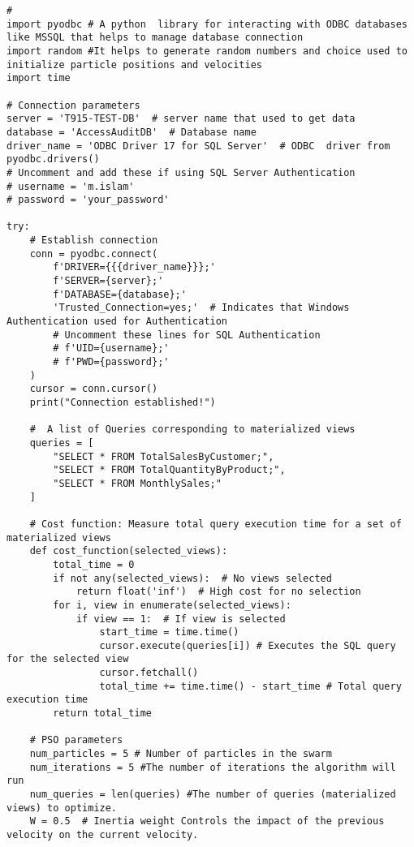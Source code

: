 \begin{lstlisting}[style=pythonstyle, caption={Python script to automate optimal view.}, label={lst:pso_query_optimization}]



# 
import pyodbc # A python  library for interacting with ODBC databases like MSSQL that helps to manage database connection
import random #It helps to generate random numbers and choice used to initialize particle positions and velocities
import time

# Connection parameters
server = 'T915-TEST-DB'  # server name that used to get data 
database = 'AccessAuditDB'  # Database name
driver_name = 'ODBC Driver 17 for SQL Server'  # ODBC  driver from pyodbc.drivers()
# Uncomment and add these if using SQL Server Authentication
# username = 'm.islam'
# password = 'your_password'

try:
    # Establish connection
    conn = pyodbc.connect(
        f'DRIVER={{{driver_name}}};'
        f'SERVER={server};'
        f'DATABASE={database};'
        'Trusted_Connection=yes;'  # Indicates that Windows Authentication used for Authentication
        # Uncomment these lines for SQL Authentication
        # f'UID={username};'
        # f'PWD={password};'
    )
    cursor = conn.cursor()
    print("Connection established!")

    #  A list of Queries corresponding to materialized views
    queries = [
        "SELECT * FROM TotalSalesByCustomer;",
        "SELECT * FROM TotalQuantityByProduct;",
        "SELECT * FROM MonthlySales;"
    ]

    # Cost function: Measure total query execution time for a set of materialized views 
    def cost_function(selected_views):
        total_time = 0
        if not any(selected_views):  # No views selected
            return float('inf')  # High cost for no selection
        for i, view in enumerate(selected_views):
            if view == 1:  # If view is selected
                start_time = time.time()
                cursor.execute(queries[i]) # Executes the SQL query for the selected view
                cursor.fetchall()
                total_time += time.time() - start_time # Total query execution time 
        return total_time

    # PSO parameters
    num_particles = 5 # Number of particles in the swarm 
    num_iterations = 5 #The number of iterations the algorithm will run
    num_queries = len(queries) #The number of queries (materialized views) to optimize.
    W = 0.5  # Inertia weight Controls the impact of the previous velocity on the current velocity.


\end{lstlisting}
